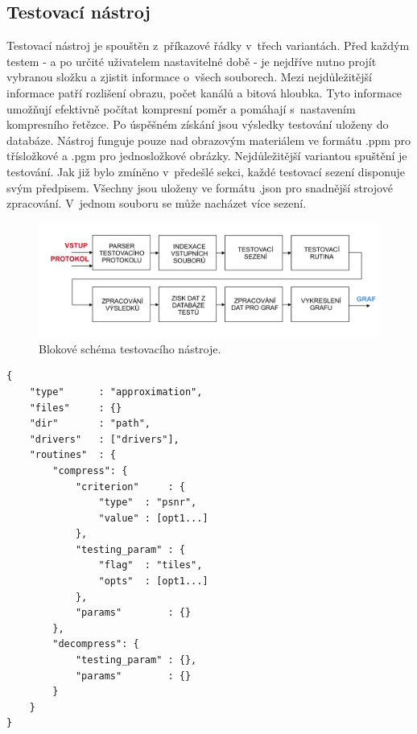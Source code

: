 \subsection*{Testovací nástroj}
Testovací nástroj je spouštěn z~příkazové řádky v~třech variantách. Před každým testem - a po určité uživatelem nastavitelné době - je nejdříve nutno projít vybranou složku a zjistit informace o~všech souborech. Mezi nejdůležitější informace patří rozlišení obrazu, počet kanálů a bitová hloubka. Tyto informace umožňují efektivně počítat kompresní poměr a pomáhají s~nastavením kompresního řetězce. Po úspěšném získání jsou výsledky testování uloženy do databáze. Nástroj funguje pouze nad obrazovým materiálem ve formátu .ppm pro třísložkové a .pgm pro jednosložkové obrázky. Nejdůležitější variantou spuštění je testování. Jak již bylo zmíněno v~předešlé sekci, každé testovací sezení disponuje svým předpisem. Všechny jsou uloženy ve formátu .json pro snadnější strojové zpracování. V~jednom souboru se může nacházet více sezení. 


\begin{figure}[hbt!]
  \hspace*{-0.5cm}
  \includegraphics[width=16cm]{obrazky-figures/schema.pdf}
  \caption{Blokové schéma testovacího nástroje.}
  \label{retezec}
\end{figure}

\clearpage

\begin{lstlisting}
{
    "type"      : "approximation",
    "files"     : {}
    "dir"       : "path",
    "drivers"   : ["drivers"],
    "routines"  : {
        "compress": {   
            "criterion"     : {
                "type"  : "psnr",
                "value" : [opt1...]
            },
            "testing_param" : {
                "flag"  : "tiles",
                "opts"  : [opt1...]
            },
            "params"        : {}
        },
        "decompress": {
            "testing_param" : {},
            "params"        : {}
        }
    }
}
\end{lstlisting}

